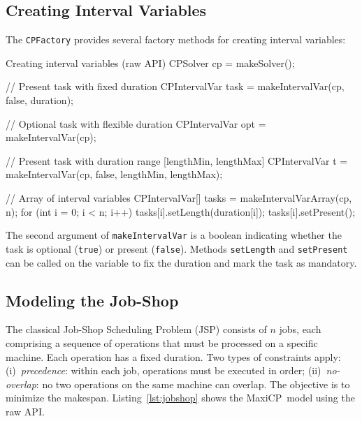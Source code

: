 \documentclass[11pt, a4paper]{scrartcl}
\newcommand{\maxicp}{\textsf{MaxiCP}}
\begin{document}
\subsection{Creating Interval Variables}

The \texttt{CPFactory} provides several factory methods for creating interval variables:

\begin{codebox}{Creating interval variables (raw API)}
CPSolver cp = makeSolver();

// Present task with fixed duration
CPIntervalVar task = makeIntervalVar(cp, false, duration);

// Optional task with flexible duration
CPIntervalVar opt = makeIntervalVar(cp);

// Present task with duration range [lengthMin, lengthMax]
CPIntervalVar t = makeIntervalVar(cp, false, lengthMin, lengthMax);

// Array of interval variables
CPIntervalVar[] tasks = makeIntervalVarArray(cp, n);
for (int i = 0; i < n; i++) {
    tasks[i].setLength(duration[i]);
    tasks[i].setPresent();
}
\end{codebox}

The second argument of \texttt{makeIntervalVar} is a boolean indicating whether the task is optional (\texttt{true}) or present (\texttt{false}).
Methods \texttt{setLength} and \texttt{setPresent} can be called on the variable to fix the duration and mark the task as mandatory.


\subsection{Modeling the Job-Shop}

The classical Job-Shop Scheduling Problem (JSP) consists of $n$ jobs, 
each comprising a sequence of operations that must be processed on a specific machine. 
Each operation has a fixed duration. Two types of constraints apply: (i)~\emph{precedence}: within each job, operations must be executed in order; 
(ii)~\emph{no-overlap}: no two operations on the same machine can overlap. 
The objective is to minimize the makespan. Listing~\ref{lst:jobshop} shows the \maxicp\ model using the raw API.
\end{document}
